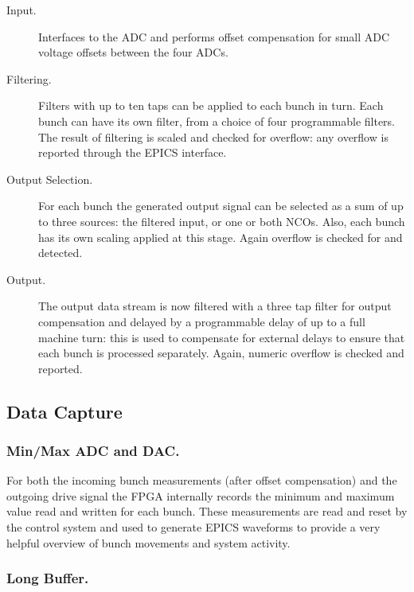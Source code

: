 \documentclass{JAC2003}
\begin{document}
\begin{description}

\item[Input.] Interfaces to the ADC and performs offset compensation for small
ADC voltage offsets between the four ADCs.

\item[Filtering.] Filters with up to ten taps can be applied to each bunch in
turn.  Each bunch can have its own filter, from a choice of four programmable
filters.  The result of filtering is scaled and checked for overflow: any
overflow is reported through the EPICS interface.

\item[Output Selection.] For each bunch the generated output signal can be
selected as a sum of up to three sources: the filtered input, or one or both
NCOs.  Also, each bunch has its own scaling applied at this stage.  Again
overflow is checked for and detected.

\item[Output.] The output data stream is now filtered with a three tap filter
for output compensation and delayed by a programmable delay of up to a full
machine turn: this is used to compensate for external delays to ensure that each
bunch is processed separately.  Again, numeric overflow is checked and reported.

\end{description}


\subsection{Data Capture}

\subsubsection{Min/Max ADC and DAC.}

For both the incoming bunch measurements (after offset compensation) and the
outgoing drive signal the FPGA internally records the minimum and maximum value
read and written for each bunch.  These measurements are read and reset by the
control system and used to generate EPICS waveforms to provide a very helpful
overview of bunch movements and system activity.

\subsubsection{Long Buffer.}
\end{document}
